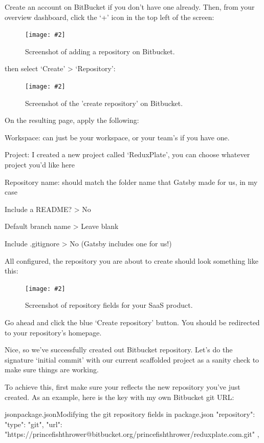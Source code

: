 \documentclass[a4paper,headinclude=on,footinclude=on,12pt,oneside]{scrbook}
\newcommand{\standardfigure}[3]{\begin{figure}[H]\begin{center}\texttt{[image: \#2]}\caption{#3}\label{fig:#2}\end{center}\end{figure}}
\begin{document}

Create an account on BitBucket if you don't have one already. Then, from your overview dashboard, click the `+' icon in the top left of the screen:

\standardfigure{\textwidth/2}{frontend/add-repository}{Screenshot of adding a repository on Bitbucket.}

then select `Create' > `Repository':

\standardfigure{\textwidth/2}{frontend/create-repository}{Screenshot of the 'create repository' on Bitbucket.}

On the resulting page, apply the following:

\begin{arrows}
\item Workspace: can just be your workspace, or your team's if you have one.
\item Project: I created a new project called `ReduxPlate', you can choose whatever project you'd like here
\item Repository name: should match the folder name that Gatsby made for us, in my case 
\item Include a README? > No
\item Default branch name > Leave blank
\item Include .gitignore > No (Gatsby includes one for us!)
\end{arrows}

All configured, the repository you are about to create should look something like this:

\standardfigure{\textwidth}{frontend/repository-fields}{Screenshot of repository fields for your SaaS product.}

Go ahead and click the blue `Create repository' button. You should be redirected to your repository's homepage.


Nice, so we've successfully created out Bitbucket repository. Let's do the signature `initial commit' with our current scaffolded project as a sanity check to make sure things are working.

To achieve this, first make sure your  reflects the new repository you've just created. As an example, here is the  key with my own Bitbucket git URL:

\begin{codeInput}{json}{package.json}{Modifying the git repository fields in package.json}
"repository": {
  "type": "git",
  "url": "https://princefishthrower@bitbucket.org/princefishthrower/reduxplate.com.git"
},
\end{codeInput}
\end{document}
